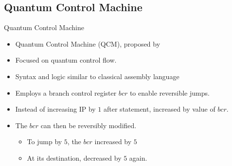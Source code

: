 \subsection{Quantum Control Machine}
\begin{frame}{Quantum Control Machine}
    \begin{itemize}
        \item Quantum Control Machine (QCM), proposed by \cite{YVC24}
        \item Focused on quantum control flow.
        \item Syntax and logic similar to classical assembly language
        \item Employs a branch control register $bcr$ to enable reversible jumps.
        \item Instead of increasing IP by $1$ after statement, increased by value of $bcr$.
        \item The $bcr$ can then be reversibly modified.
        \begin{itemize}
            \item To jump by $5$, the $bcr$ increased by $5$
            \item At its destination, decreased by $5$ again.
        \end{itemize}
    \end{itemize}
\end{frame}


